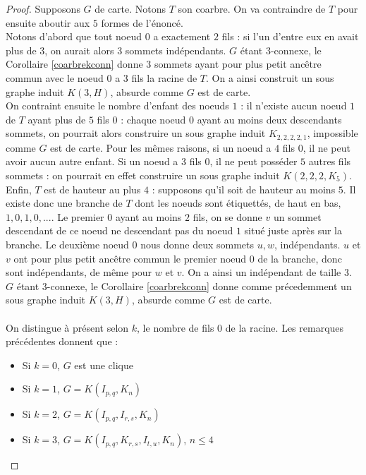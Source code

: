 \documentclass{scrartcl}
\begin{document}
\begin{flushleft}
\begin{proof}
    Supposons $G$ de carte. Notons $T$ son coarbre. On va contraindre de $T$ pour ensuite aboutir aux $5$ formes de l'énoncé.\\
    Notons d'abord que tout noeud $0$ a exactement $2$ fils : si l'un d'entre eux en avait
    plus de $3$, on aurait alors $3$ sommets indépendants. $G$ étant $3$-connexe, le Corollaire \ref{coarbrekconn} donne $3$ sommets
    ayant pour plus petit ancêtre commun avec le noeud $0$ a $3$ fils la racine de $T$. On a ainsi construit un sous graphe induit
    $K(3, H)$, absurde comme $G$ est de carte.\\
    On contraint ensuite le nombre d'enfant des noeuds $1$ : il n'existe aucun noeud $1$ de $T$ ayant plus de $5$ fils $0$ :
    chaque noeud $0$ ayant au moins deux descendants sommets, on pourrait alors construire un sous graphe induit $K_{2,2,2,2,1}$,
    impossible comme $G$ est de carte. Pour les mêmes raisons, si un noeud a $4$ fils $0$, il ne peut avoir aucun autre enfant.
    Si un noeud a $3$ fils $0$, il ne peut posséder $5$ autres fils sommets : on pourrait en effet construire un sous graphe induit
    $K(2,2,2,K_5)$.\\
    Enfin, $T$ est de hauteur au plus $4$ : supposons qu'il soit de hauteur au moins $5$. Il existe donc une branche de $T$ dont les noeuds
    sont étiquettés, de haut en bas, $1, 0, 1, 0, ...$. Le premier $0$ ayant au moins $2$ fils, on se donne $v$ un sommet descendant de ce
    noeud ne descendant pas du noeud $1$ situé juste après sur la branche. Le deuxième noeud $0$ nous donne deux sommets $u, w$, indépendants.
    $u$ et $v$ ont pour plus petit ancêtre commun le premier noeud $0$ de la branche, donc sont indépendants, de même pour $w$ et $v$. On a
    ainsi un indépendant de taille $3$. $G$ étant $3$-connexe, le Corollaire \ref{coarbrekconn} donne comme précedemment un sous
    graphe induit $K(3, H)$, absurde comme $G$ est de carte.
    \\~\\
    On distingue à présent selon $k$, le nombre de fils $0$ de la racine. Les remarques précédentes donnent que :
    \begin{itemize}
        \item Si $k = 0$, $G$ est une clique
        \item Si $k = 1$, $G = K(I_{p,q}, K_n)$
        \item Si $k = 2$, $G = K(I_{p,q}, I_{r,s}, K_n)$
        \item Si $k = 3$, $G = K(I_{p,q}, K_{r,s}, I_{t,u}, K_n)$, $n \leq 4$

\end{itemize}
\end{proof}
\end{flushleft}
\end{document}
